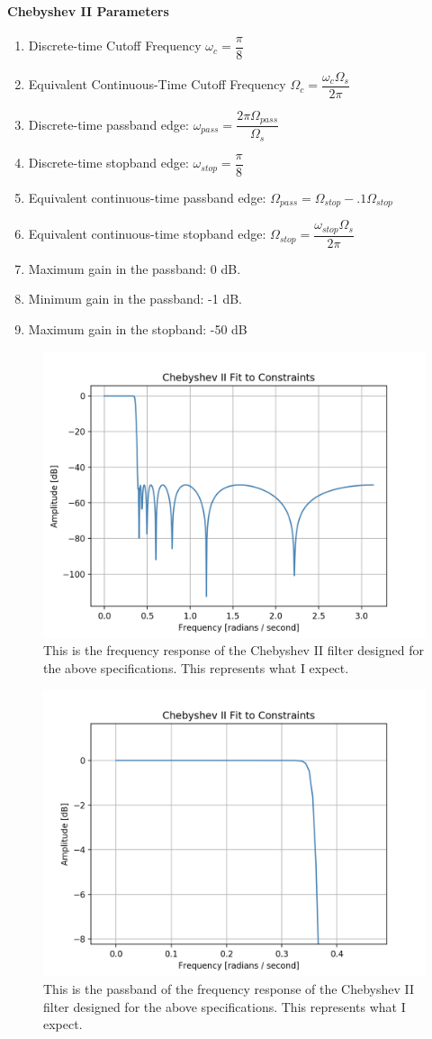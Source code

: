 \documentclass{article}
\begin{document}
\paragraph{Chebyshev II Parameters}
\begin{enumerate}
    \item Discrete-time Cutoff Frequency $\omega_c = \dfrac{\pi}{8}$
    \item Equivalent Continuous-Time Cutoff Frequency $\Omega_c = \dfrac{\omega_c\Omega_s}{2\pi}$
    \item Discrete-time passband edge: $\omega_{pass} =  \dfrac{2\pi\Omega_{pass}}{\Omega_s} $
    \item Discrete-time stopband edge: $\omega_{stop} = \dfrac{\pi}{8}$
    \item Equivalent continuous-time passband edge: $\Omega_{pass} = \Omega_{stop} - .1\Omega_{stop}$
    \item Equivalent continuous-time stopband edge: $\Omega_{stop} = \dfrac{\omega_{stop}\Omega_s}{2\pi}$
    \item Maximum gain in the passband: 0 dB.
    \item Minimum gain in the passband: -1 dB.
    \item Maximum gain in the stopband: -50 dB
\end{enumerate}

\begin{figure}[h] \label{fig:chebII}
    \centering
    \includegraphics[width=.5\textwidth]{kaiser_1.png}
    \caption{This is the frequency response of the Chebyshev II filter designed for the above specifications. This represents what I expect.}
\end{figure}

\begin{figure}[h] \label{fig:chebII}
    \centering
    \includegraphics[width=.5\textwidth]{kaiser_2.png}
    \caption{This is the passband of the frequency response of the Chebyshev II filter designed for the above specifications. This represents what I expect.}
\end{figure}
\end{document}
